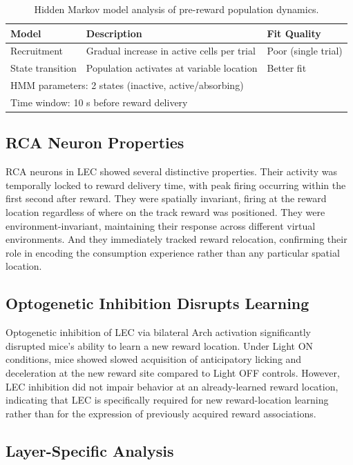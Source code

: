 \documentclass[12pt]{article}
\begin{document}
\begin{table}[ht]
\centering
\caption{Hidden Markov model analysis of pre-reward population dynamics.}
\label{tab:hmm}
\begin{tabular}{lll}
\toprule
Model & Description & Fit Quality \\
\midrule
Recruitment & Gradual increase in active cells per trial & Poor (single trial) \\
State transition & Population activates at variable location & Better fit \\
\midrule
\multicolumn{3}{l}{HMM parameters: 2 states (inactive, active/absorbing)} \\
\multicolumn{3}{l}{Time window: 10 s before reward delivery} \\
\bottomrule
\end{tabular}
\end{table}

\subsection{RCA Neuron Properties}

RCA neurons in LEC showed several distinctive properties. Their activity was temporally locked to reward delivery time, with peak firing occurring within the first second after reward. They were spatially invariant, firing at the reward location regardless of where on the track reward was positioned. They were environment-invariant, maintaining their response across different virtual environments. And they immediately tracked reward relocation, confirming their role in encoding the consumption experience rather than any particular spatial location.

\subsection{Optogenetic Inhibition Disrupts Learning}

Optogenetic inhibition of LEC via bilateral Arch activation significantly disrupted mice's ability to learn a new reward location. Under Light ON conditions, mice showed slowed acquisition of anticipatory licking and deceleration at the new reward site compared to Light OFF controls. However, LEC inhibition did not impair behavior at an already-learned reward location, indicating that LEC is specifically required for new reward-location learning rather than for the expression of previously acquired reward associations.

\subsection{Layer-Specific Analysis}
\end{document}
